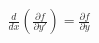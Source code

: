 \documentclass[preview]{standalone}
\begin{document}
\begin{align*}
\frac{d}{dx}\left(\frac{\partial f}{\partial y'}\right) = \frac{\partial f}{\partial y}
\end{align*}
\end{document}
